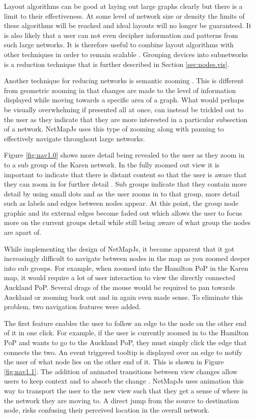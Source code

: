 \documentclass[11pt, a4paper]{article}
\begin{document}
Layout algorithms can be good at laying out large graphs clearly but there is a
limit to their effectiveness. At some level of network size or density the
limits of these algorithms will be reached and ideal layouts will no longer be
guaranteed. It is also likely that a user can not even decipher information and
patterns from such large networks. It is therefore useful to combine layout
algorithms with other techniques in order to remain scalable \cite{Herman_2000}.
Grouping devices into subnetworks is a reduction technique that is further
described in Section \ref{sec:nodes.vis}. 

Another technique for reducing networks is semantic zooming \cite{Perlin_1993}.
This is different from geometric zooming in that changes are made to the level
of information displayed while moving towards a specific area of a graph. What
would perhaps be visually overwhelming if presented all at once, can instead be
trickled out to the user as they indicate that they are more interested in a
particular subsection of a network. NetMapJs uses this type of zooming along
with panning to effectively navigate throughout large networks. 

Figure \ref{fig:nav1.0} shows more detail being revealed to the user as they
zoom in to a sub group of the Karen network. In the fully zoomed out view it is
important to indicate that there is distant content so that the user is aware
that they can zoom in for further detail \cite{Spence_2007}. Sub groups indicate
that they contain more detail by using small dots and as the user zooms in to
that group, more detail such as labels and edges between nodes appear. At this
point, the group node graphic and its external edges become faded out which
allows the user to focus more on the current groups detail while still being
aware of what group the nodes are apart of.

While implementing the design of NetMapJs, it became apparent that it got
increasingly difficult to navigate between nodes in the map as you zoomed deeper
into sub groups. For example, when zoomed into the Hamilton PoP in the Karen
map, it would require a lot of user interaction to view the directly connected
Auckland PoP. Several drags of the mouse would be required to pan towards
Auckland or zooming back out and in again even made sense. To eliminate this
problem, two navigation features were added.

The first feature enables the user to follow an edge to the node on the other
end of it in one click. For example, if the user is currently zoomed in to the
Hamilton PoP and wants to go to the Auckland PoP, they must simply click the
edge that connects the two. An event triggered tooltip is displayed over an edge
to notify the user of what node lies on the other end of it. This is shown in
Figure \ref{fig:nav1.1}. The addition of animated transitions between view
changes allow users to keep context and to absorb the change
\cite{Lamping_1995}.  NetMapJs uses animation this way to transport the user to
the new view such that they get a sense of where in the network they are moving
to. A direct jump from the source to destination node, risks confusing their
perceived location in the overall network.
\end{document}
